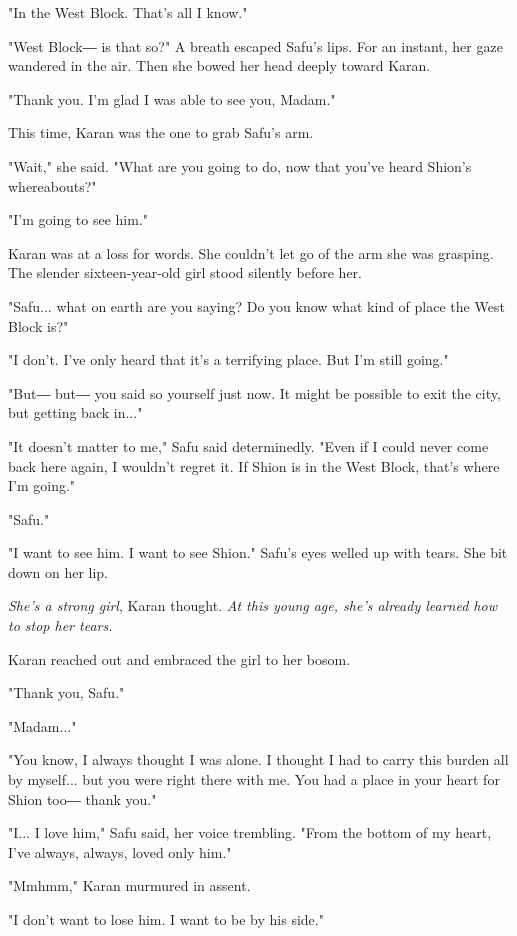 "In the West Block. That's all I know."

"West Block― is that so?" A breath escaped Safu's lips. For an instant,
her gaze wandered in the air. Then she bowed her head deeply toward
Karan.

"Thank you. I'm glad I was able to see you, Madam."

This time, Karan was the one to grab Safu's arm.

"Wait," she said. "What are you going to do, now that you've heard
Shion's whereabouts?"

"I'm going to see him."

\mybreak

Karan was at a loss for words. She couldn't let go of the arm she was
grasping. The slender sixteen-year-old girl stood silently before her.

"Safu... what on earth are you saying? Do you know what kind of place
the West Block is?"

"I don't. I've only heard that it's a terrifying place. But I'm still
going."

"But― but― you said so yourself just now. It might be possible to exit
the city, but getting back in..."

"It doesn't matter to me," Safu said determinedly. "Even if I could
never come back here again, I wouldn't regret it. If Shion is in the
West Block, that's where I'm going."

"Safu."

"I want to see him. I want to see Shion." Safu's eyes welled up with
tears. She bit down on her lip.

\emph{She's a strong girl}, Karan thought. \emph{At this young age, she's already
	learned how to stop her tears.}

Karan reached out and embraced the girl to her bosom.

"Thank you, Safu."

"Madam..."

"You know, I always thought I was alone. I thought I had to carry this
burden all by myself... but you were right there with me. You had a
place in your heart for Shion too― thank you."

"I... I love him," Safu said, her voice trembling. "From the bottom of
my heart, I've always, always, loved only him."

"Mmhmm," Karan murmured in assent.

"I don't want to lose him. I want to be by his side."

